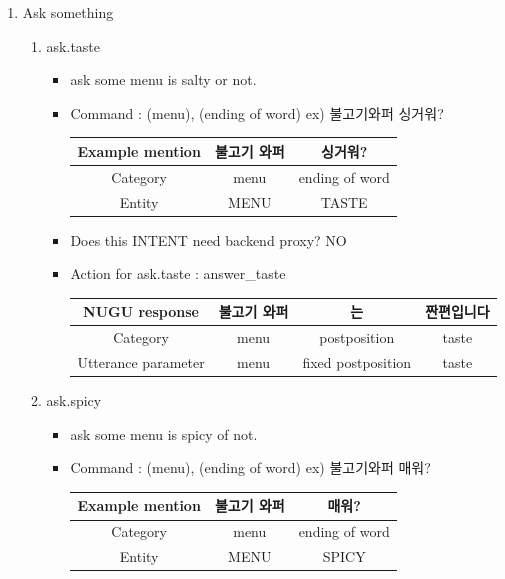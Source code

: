 \documentclass[conference,compsoc]{IEEEtran}
\begin{document}
\begin{enumerate}
\begin{enumerate}
  \end{enumerate}

  \item Ask something
  \begin{enumerate}
    \item ask.taste
    \begin{itemize}
      \item ask some menu is salty or not.
      \item Command : (menu), (ending of word) ex) 불고기와퍼 싱거워?
      \begin{table}[h!] \renewcommand\arraystretch{1.75}
        \centering
          \begin{tabular}{@{}c | c c @{}}
          \hline
          Example mention & 불고기 와퍼 & 싱거워?  \\ 
          \hline
          Category        & menu   & ending of word  \\ 
          \hline
          Entity  & MENU   & TASTE   \\
          \hline
          \end{tabular}
      \end{table}  

      \item Does this INTENT need backend proxy? NO
      \item Action for ask.taste : answer\_taste
      \begin{table}[h!] \renewcommand\arraystretch{1.75}
        \centering
          \begin{tabular}{@{}c | c c c @{}}
          \hline
          NUGU response & 불고기 와퍼 & 는  & 짠편입니다 \\ 
          \hline
          Category        & menu   & postposition & taste \\ 
          \hline
          Utterance parameter  & {{menu}}   & fixed postposition & {{taste}} \\
          \hline
          \end{tabular}
      \end{table}  
    \end{itemize}
    
    \item ask.spicy
    \begin{itemize}
      \item ask some menu is spicy of not.
      \item Command : (menu), (ending of word) ex) 불고기와퍼 매워?
      \begin{table}[h!] \renewcommand\arraystretch{1.75}
        \centering
          \begin{tabular}{@{}c | c c @{}}
          \hline
          Example mention & 불고기 와퍼 & 매워?  \\ 
          \hline
          Category        & menu   & ending of word  \\ 
          \hline
          Entity  & MENU   & SPICY   \\
          \hline
          \end{tabular}
      \end{table}  


\end{itemize}
\end{enumerate}
\end{enumerate}
\end{document}
